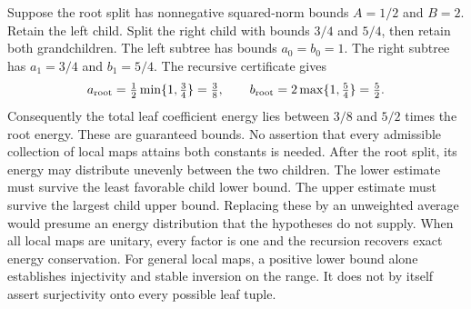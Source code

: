 Suppose the root split has nonnegative squared-norm bounds $A=1/2$ and $B=2$. Retain the left child. Split the right child with bounds $3/4$ and $5/4$, then retain both grandchildren.
The left subtree has bounds $a_0=b_0=1$. The right subtree has $a_1=3/4$ and $b_1=5/4$. The recursive certificate gives
\[
a_{\rm root}=\tfrac12\min\{1,\tfrac34\}=\tfrac38,
\qquad
b_{\rm root}=2\max\{1,\tfrac54\}=\tfrac52.
\]
Consequently the total leaf coefficient energy lies between $3/8$ and $5/2$ times the root energy. These are guaranteed bounds. No assertion that every admissible collection of local maps attains both constants is needed.
After the root split, its energy may distribute unevenly between the two children. The lower estimate must survive the least favorable child lower bound. The upper estimate must survive the largest child upper bound. Replacing these by an unweighted average would presume an energy distribution that the hypotheses do not supply.
When all local maps are unitary, every factor is one and the recursion recovers exact energy conservation. For general local maps, a positive lower bound alone establishes injectivity and stable inversion on the range. It does not by itself assert surjectivity onto every possible leaf tuple.

